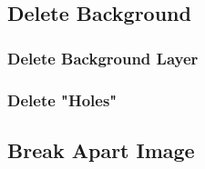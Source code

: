 \documentclass{article}
\title{
    
}
\author{Harald Kraft}
\date{
    \today
    \bigbreak
    
}
\begin{document}
    \maketitle

    \tableofcontents

    \pagebreak

    

        

        

        

        

        

    \pagebreak

    

        

        \pagebreak

        

        

            

            

        

         \label{vectorConversion}

        \subsection{Delete Background}

            \subsubsection{Delete Background Layer}

            \subsubsection{Delete "Holes"}

        \subsection{Break Apart Image}
\end{document}
